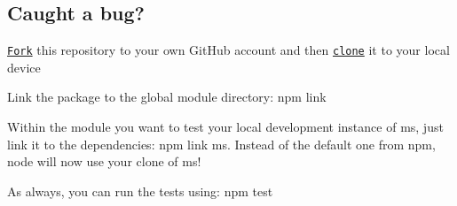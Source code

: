 \subsection*{Caught a bug?}


\begin{DoxyEnumerate}
\item \href{https://help.github.com/articles/fork-a-repo/}{\tt Fork} this repository to your own Git\+Hub account and then \href{https://help.github.com/articles/cloning-a-repository/}{\tt clone} it to your local device
\item Link the package to the global module directory\+: {\ttfamily npm link}
\item Within the module you want to test your local development instance of ms, just link it to the dependencies\+: {\ttfamily npm link ms}. Instead of the default one from npm, node will now use your clone of ms!
\end{DoxyEnumerate}

As always, you can run the tests using\+: {\ttfamily npm test} 